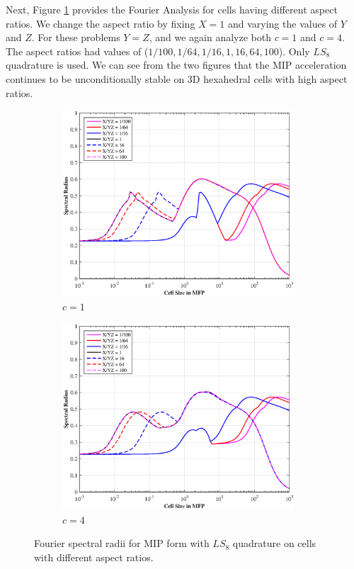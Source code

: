 Next, Figure \ref{fig::DSA_3D1G_Fourier_AR} provides the Fourier Analysis for cells having different aspect ratios. We change the aspect ratio by fixing $X=1$ and varying the values of $Y$ and $Z$. For these problems $Y=Z$, and we again analyze both $c=1$ and $c=4$. The aspect ratios had values of ($1/100,1/64,1/16,1,16,64,100$). Only $LS_8$ quadrature is used. We can see from the two figures that the MIP acceleration continues to be unconditionally stable on 3D hexahedral cells with high aspect ratios. 

\begin{figure}
\centering
	\begin{subfigure}[b]{0.80\textwidth}
		\centering
		\includegraphics[width=0.95\textwidth]{figures/sec_DSA/SI_MIP_hex_PWLD1_AR1.eps}
		\caption{$c=1$}
	\end{subfigure}
	\vfill
	\begin{subfigure}[b]{0.80\textwidth}
		\centering
		\includegraphics[width=0.95\textwidth]{figures/sec_DSA/SI_MIP_hex_PWLD1_AR4.eps}
		\caption{$c=4$}
	\end{subfigure}
\caption{Fourier spectral radii for MIP form with $LS_8$ quadrature on cells with different aspect ratios.}
\label{fig::DSA_3D1G_Fourier_AR}
\end{figure}

